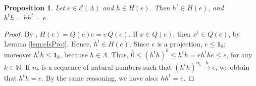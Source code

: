 \documentclass[12pt]{article}
\theoremstyle{plain}
\newtheorem{proposition}{Proposition}
\theoremstyle{definition}
\theoremstyle{remark}
\numberwithin{equation}{section}
\begin{document}
\begin{proposition}
\label{prop:htranspose}
Let $e \in \mathcal{E}(\Lambda)$ and $h \in H(e)$.
Then $h^{t} \in H(e)$, and $h^{t} h = h h^{t} = e$.
\end{proposition}
\begin{proof}
    By \cite[Theorem 8]{schwarz1955hausdorff},
    $H(e) = Q(e) e = e \, Q(e)$.
    If $x \in Q(e)$, then $x^{t} \in Q(e)$,
    by Lemma \ref{lem:eIsProj}.
    Hence, $h^{t} \in H(e)$.
    Since $e$ is a projection, $e \leq \mathbf{1}_{8}$;
    moreover $h^{t} h \leq \mathbf{1}_{8}$, because $h \in \Lambda$.
    Thus, $\hat{0} \leq (h^{t} h)^{k} \leq h^{t} h = e h^{t} h e \leq e$,
    for any $k \in \mathbb{N}$.
    If $n_{k}$ is a sequence of natural numbers such that
    $(h^{t} h)^{n_{k}} \overset{k}{\rightarrow} e$,
    we obtain that $h^{t} h = e$.
    By the same reasoning, we have also: $h h^{t} = e$.
\end{proof}
\end{document}
